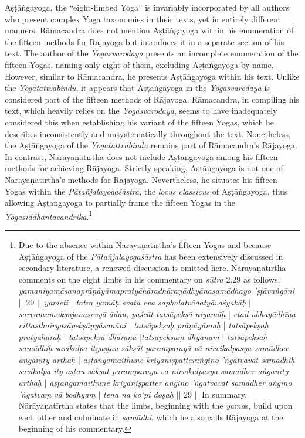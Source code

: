 Aṣṭāṅgayoga, the ``eight-limbed Yoga'' is invariably incorporated by all authors who present complex Yoga taxonomies in their texts, yet in entirely different manners. Rāmacandra does not mention Aṣṭāṅgayoga within his enumeration of the fifteen methods for Rājayoga but introduces it in a separate section of his text.
The author of the \textit{Yogasvarodaya} presents an incomplete enumeration of the fifteen Yogas, naming only eight of them, excluding Aṣṭāṅgayoga by name. However, similar to Rāmacandra, he presents Aṣṭāṅgayoga within his text. Unlike the \textit{Yogatattvabindu}, it appears that Aṣṭāṅgayoga in the \textit{Yogasvarodaya} is considered part of the fifteen methods of Rājayoga. Rāmacandra, in compiling his text, which heavily relies on the \textit{Yogasvarodaya}, seems to have inadequately considered this when establishing his variant of the fifteen Yogas, which he describes inconsistently and unsystematically throughout the text. Nonetheless, the Aṣṭāṅgayoga of the \textit{Yogatattvabindu} remains part of Rāmacandra's Rājayoga.
In contrast, Nārāyaṇatīrtha does not include Aṣṭāṅgayoga among his fifteen methods for achieving Rājayoga. Strictly speaking, Aṣṭāṅgayoga is not one of Nārāyaṇatīrtha's methods for Rājayoga. Nevertheless, he situates his fifteen Yogas within the \textit{Pātañjalayogaśāstra}, the \textit{locus classicus} of Aṣṭāṅgayoga, thus allowing Aṣṭāṅgayoga to partially frame the fifteen Yogas in the \textit{Yogasiddhāntacandrikā}.\footnote{Due to the absence within Nārāyaṇatīrtha's fifteen Yogas and because Aṣṭāṅgayoga of the \textit{Pātañjalayogaśāstra} has been extensively discussed in secondary literature, a renewed discussion is omitted here. Nārāyaṇatīrtha comments on the eight limbs in his commentary on \textit{sūtra} 2.29 as follows: \textit{yamaniyamāsanaprāṇāyāmapratyāhāradhāraṇādhyānasamādhayo 'ṣṭāvaṅgāni} || 29 || \textit{yameti} | \textit{tatra yamāḥ svata eva saphalatvādatyāvaśyakāḥ} | \textit{sarvamumukṣujanasevyā ādau, paścāt tatsāpekṣā niyamāḥ} | \textit{etad ubhayādhīna cittasthairyasāpekṣāṇyāsanāni} | \textit{tatsāpekṣaḥ prāṇāyāmaḥ} | \textit{tatsāpekṣaḥ pratyāhāraḥ} | \textit{tatsāpekṣā dhāraṇā} |\textit{tatsāpekṣaṃ dhyānam} | \textit{tatsāpekṣaḥ samādhiḥ savikalpa ityaṣṭau sākṣāt paramparayā vā nirvikalpasya samādher aṅgānīty arthaḥ} | \textit{aṣṭāṅgamaithune kriyāniṣpatteraṅgino 'ṅgatvavat samādhiḥ savikalpa ity aṣṭau sākṣāt paramparayā vā nirvikalpasya samādher aṅgānīty arthaḥ} | \textit{aṣṭāṅgamaithune kriyāniṣpatter aṅgino 'ṅgatvavat samādher aṅgino 'ṅgatvaṃ vā bodhyam} | \textit{tena na ko'pi doṣaḥ} || 29 || In summary, Nārāyaṇatīrtha states that the limbs, beginning with the \textit{yama}s, build upon each other and culminate in \textit{samādhi}, which he also calls Rājayoga at the beginning of his commentary.}

